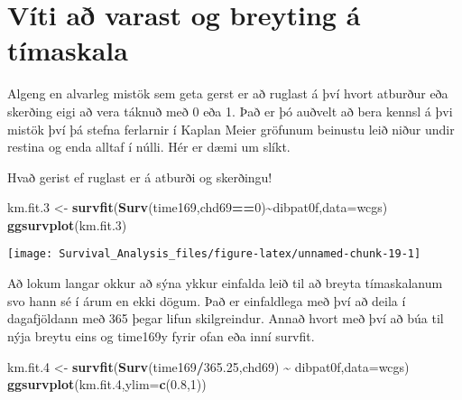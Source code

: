 \documentclass[
]{book}
\newenvironment{Shaded}{\begin{snugshade}}{\end{snugshade}}
\newcommand{\DataTypeTok}[1]{\textcolor[rgb]{0.13,0.29,0.53}{#1}}
\newcommand{\DecValTok}[1]{\textcolor[rgb]{0.00,0.00,0.81}{#1}}
\newcommand{\FloatTok}[1]{\textcolor[rgb]{0.00,0.00,0.81}{#1}}
\newcommand{\KeywordTok}[1]{\textcolor[rgb]{0.13,0.29,0.53}{\textbf{#1}}}
\newcommand{\NormalTok}[1]{#1}
\newcommand{\OperatorTok}[1]{\textcolor[rgb]{0.81,0.36,0.00}{\textbf{#1}}}
\newcommand{\StringTok}[1]{\textcolor[rgb]{0.31,0.60,0.02}{#1}}
\begin{document}
\hypertarget{vuxedti-auxf0-varast-og-breyting-uxe1-tuxedmaskala}{%
\section{Víti að varast og breyting á tímaskala}\label{vuxedti-auxf0-varast-og-breyting-uxe1-tuxedmaskala}}

Algeng en alvarleg mistök sem geta gerst er að ruglast á því hvort atburður eða skerðing eigi að vera táknuð með 0 eða 1. Það er þó auðvelt að bera kennsl á þvi mistök því þá stefna ferlarnir í Kaplan Meier gröfunum beinustu leið niður undir restina og enda alltaf í núlli. Hér er dæmi um slíkt.

Hvað gerist ef ruglast er á atburði og skerðingu!

\begin{Shaded}
\begin{Highlighting}[]
\NormalTok{km.fit}\FloatTok{.3}\NormalTok{ <{-}}\StringTok{ }\KeywordTok{survfit}\NormalTok{(}\KeywordTok{Surv}\NormalTok{(time169,chd69}\OperatorTok{==}\DecValTok{0}\NormalTok{)}\OperatorTok{\textasciitilde{}}\NormalTok{dibpat0f,}\DataTypeTok{data=}\NormalTok{wcgs)}
\KeywordTok{ggsurvplot}\NormalTok{(km.fit}\FloatTok{.3}\NormalTok{) }
\end{Highlighting}
\end{Shaded}

\texttt{[image: Survival\_Analysis\_files/figure-latex/unnamed-chunk-19-1]}

Að lokum langar okkur að sýna ykkur einfalda leið til að breyta tímaskalanum svo hann sé í árum en ekki dögum. Það er einfaldlega með því að deila í dagafjöldann með 365 þegar lifun skilgreindur. Annað hvort með því að búa til nýja breytu eins og time169y fyrir ofan eða inní survfit.

\begin{Shaded}
\begin{Highlighting}[]
\NormalTok{km.fit}\FloatTok{.4}\NormalTok{ <{-}}\StringTok{ }\KeywordTok{survfit}\NormalTok{(}\KeywordTok{Surv}\NormalTok{(time169}\OperatorTok{/}\FloatTok{365.25}\NormalTok{,chd69) }\OperatorTok{\textasciitilde{}}\StringTok{ }\NormalTok{dibpat0f,}\DataTypeTok{data=}\NormalTok{wcgs)}
\KeywordTok{ggsurvplot}\NormalTok{(km.fit}\FloatTok{.4}\NormalTok{,}\DataTypeTok{ylim=}\KeywordTok{c}\NormalTok{(}\FloatTok{0.8}\NormalTok{,}\DecValTok{1}\NormalTok{))  }
\end{Highlighting}
\end{Shaded}
\end{document}
